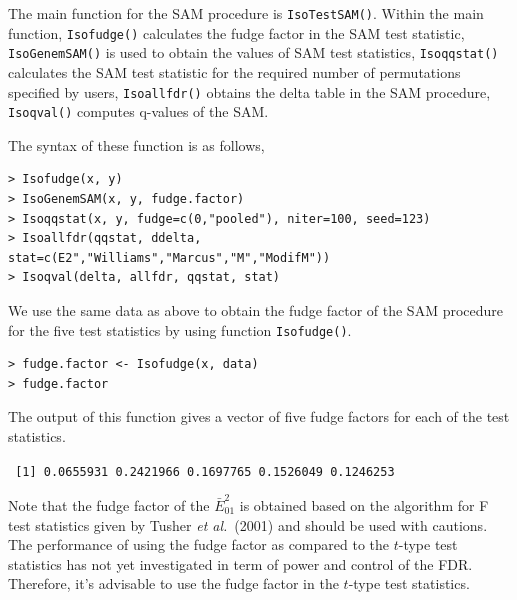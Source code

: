 The main function for the SAM procedure is \texttt{IsoTestSAM()}. Within the main function, \texttt{Isofudge()}
calculates the fudge factor in the SAM test statistic, \texttt{IsoGenemSAM()} is used
to obtain the values of SAM test statistics, \texttt{Isoqqstat()} calculates the SAM test statistic
for the required number of permutations specified by users, \texttt{Isoallfdr()} obtains the delta table in the SAM procedure,
\texttt{Isoqval()} computes q-values of the SAM.  %

The syntax of these function is as follows,
\begin{center}
\begin{boxit}
\begin{verbatim}
> Isofudge(x, y)
> IsoGenemSAM(x, y, fudge.factor)
> Isoqqstat(x, y, fudge=c(0,"pooled"), niter=100, seed=123)
> Isoallfdr(qqstat, ddelta, stat=c(E2","Williams","Marcus","M","ModifM"))
> Isoqval(delta, allfdr, qqstat, stat)
\end{verbatim}
\end{boxit}
\end{center}


We use the same data as above to obtain the fudge factor of the SAM procedure for
the five test statistics by using function \texttt{Isofudge()}.
\begin{center}
\begin{boxit}
\begin{verbatim}
> fudge.factor <- Isofudge(x, data)
> fudge.factor
\end{verbatim}
\end{boxit}
\end{center}

The output of this function gives a vector of five fudge factors for each of the test statistics.
\begin{center}
\begin{boxit}
\texttt{
[1] 0.0655931 0.2421966 0.1697765 0.1526049 0.1246253
}
\end{boxit}
\end{center}
Note that the fudge factor of the $\bar{E}_{01}^2$ is obtained based on the algorithm for F test
statistics given by Tusher \textit{et al.}\ (2001) and should be used with cautions. The performance of using
the fudge factor as compared to the $t$-type test statistics has not yet investigated in term of
power and control of the FDR. Therefore, it's advisable to use the fudge factor in the $t$-type test statistics.


